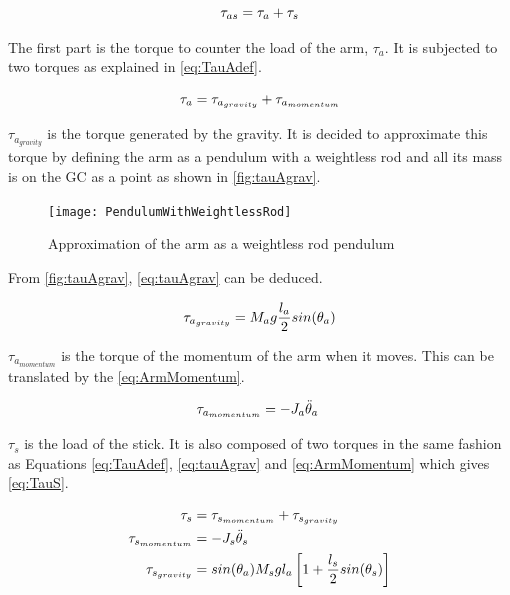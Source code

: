 \begin{equation}\label{eq:TauasBegin}
	\tau_{as}=\tau_a+\tau_s \addunit{\newton\meter}
\end{equation}
\startexplain
{}
\stopexplain

The first part is the torque to counter the load of the arm, $\tau_a$. It is subjected to two torques as explained in \autoref{eq:TauAdef}.

\begin{equation}\label{eq:TauAdef}
	\tau_a=\tau_{a_{gravity}}+\tau_{a_{momentum}} \addunit{\newton\meter}
\end{equation}

 $\tau_{a_{gravity}}$ is the torque generated by the gravity. It is decided to approximate this torque by defining the arm as a pendulum with a weightless rod and all its mass is on the GC as a point as shown in \autoref{fig:tauAgrav}.
 
 \begin{figure}[htbp]
 	\centering
 	\texttt{[image: PendulumWithWeightlessRod]}
 	\caption{Approximation of the arm as a weightless rod pendulum}\label{fig:tauAgrav}
 \end{figure}
 
 From \autoref{fig:tauAgrav}, \autoref{eq:tauAgrav} can be deduced.

\begin{equation}\label{eq:tauAgrav}
	\tau_{a_{gravity}}=M_a g \frac{l_a}{2} sin(\theta_a) \addunit{\newton\meter}
\end{equation}
\startexplain
{}
\stopexplain

$\tau_{a_{momentum}}$ is the torque of the momentum of the arm when it moves. This can be translated by the \autoref{eq:ArmMomentum}.

\begin{equation}\label{eq:ArmMomentum}
	\tau_{a_{momentum}}=-J_a \ddot\theta_a\ \addunit{\newton\meter}
\end{equation}
\startexplain
{}
\stopexplain

$\tau_s$ is the load of the stick. It is also composed of two torques in the same fashion as Equations \eqref{eq:TauAdef}, \eqref{eq:tauAgrav} and \eqref{eq:ArmMomentum} which gives \autoref{eq:TauS}.

\begin{subequations}\label{eq:TauS}
	\begin{flalign}
		\tau_s&=\tau_{s_{momentum}}+\tau_{s_{gravity}} \addunit{\newton\meter}\\
		\tau_{s_{momentum}}&=-J_s \ddot\theta_s\ \addunit{\newton\meter}\label{eq:TausMomentum}\\
		\tau_{s_{gravity}}&=sin(\theta_a)M_s g l_a \left[1+\frac{l_s}{2}sin(\theta_s)\right] \addunit{\newton\meter}		
	\end{flalign}
\end{subequations}

